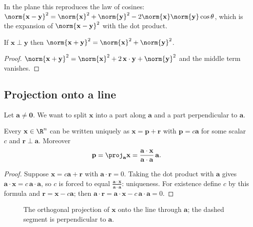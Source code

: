 In the plane this reproduces the law of cosines: $\norm{\mathbf{x}-\mathbf{y}}^2=\norm{\mathbf{x}}^2+\norm{\mathbf{y}}^2-2\norm{\mathbf{x}}\norm{\mathbf{y}}\cos\theta$, which is the expansion of $\norm{\mathbf{x}-\mathbf{y}}^2$ with the dot product.

\begin{theorem}[Pythagoras]
If $\mathbf{x}\perp\mathbf{y}$ then $\norm{\mathbf{x}+\mathbf{y}}^2=\norm{\mathbf{x}}^2+\norm{\mathbf{y}}^2$.
\end{theorem}

\begin{proof}
$\norm{\mathbf{x}+\mathbf{y}}^2=\norm{\mathbf{x}}^2+2\,\mathbf{x}\cdot\mathbf{y}+\norm{\mathbf{y}}^2$ and the middle term vanishes.
\end{proof}

\subsection*{Projection onto a line}

Let $\mathbf{a}\ne\mathbf{0}$. We want to split $\mathbf{x}$ into a part along $\mathbf{a}$ and a part perpendicular to $\mathbf{a}$.

\begin{theorem}\label{thm:projline}
Every $\mathbf{x}\in\R^n$ can be written uniquely as $\mathbf{x}=\mathbf{p}+\mathbf{r}$ with $\mathbf{p}=c\mathbf{a}$ for some scalar $c$ and $\mathbf{r}\perp\mathbf{a}$. Moreover
\[ \mathbf{p}=\proj_{\mathbf{a}}\mathbf{x}=\frac{\mathbf{a}\cdot\mathbf{x}}{\mathbf{a}\cdot\mathbf{a}}\,\mathbf{a}. \]
\end{theorem}

\begin{proof}
Suppose $\mathbf{x}=c\mathbf{a}+\mathbf{r}$ with $\mathbf{a}\cdot\mathbf{r}=0$. Taking the dot product with $\mathbf{a}$ gives $\mathbf{a}\cdot\mathbf{x}=c\,\mathbf{a}\cdot\mathbf{a}$, so $c$ is forced to equal $\frac{\mathbf{a}\cdot\mathbf{x}}{\mathbf{a}\cdot\mathbf{a}}$: uniqueness. For existence define $c$ by this formula and $\mathbf{r}=\mathbf{x}-c\mathbf{a}$; then $\mathbf{a}\cdot\mathbf{r}=\mathbf{a}\cdot\mathbf{x}-c\,\mathbf{a}\cdot\mathbf{a}=0$.
\end{proof}

\begin{figure}[h]
\centering
{}
\caption{The orthogonal projection of $\mathbf{x}$ onto the line through $\mathbf{a}$; the dashed segment is perpendicular to $\mathbf{a}$.}
\end{figure}

